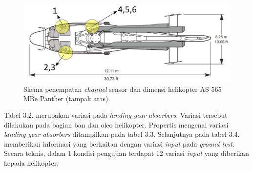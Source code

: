\begin{figure}[H]
	\centering
	\includegraphics[width=0.79\linewidth]{gambar/tampak_atas.png}
	\caption{Skema penempatan \textit{channel} sensor dan dimensi helikopter AS 565 MBe Panther (tampak atas).}
	\label{tampak_atas.png}
\end{figure}

Tabel 3.2. merupakan variasi pada \textit{landing gear absorbers}. Variasi tersebut dilakukan pada bagian ban dan oleo helikopter. Propertis mengenai variasi \textit{landing gear absorbers} ditampilkan pada tabel 3.3. Selanjutnya pada tabel 3.4. memberikan informasi yang berkaitan dengan variasi \textit{input} pada \textit{ground test}. Secara teknis, dalam 1 kondisi pengujian terdapat 12 variasi \textit{input} yang diberikan kepada helikopter. 

